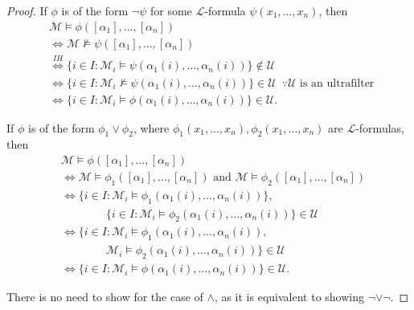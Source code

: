 \documentclass[notoc,notitlepage]{tufte-book}
\begin{document}
\begin{proof}
    \noindent
     If $\phi$ is of the form $\neg \psi$ for some $\mathcal{L}$-formula $\psi(x_1, \ldots, x_n)$, then
    \begin{align*}
      &\mathcal{M} \models \phi([\alpha_1], \ldots, [\alpha_n]) \\
      &\iff \mathcal{M} \not\models \psi([\alpha_1], \ldots, [\alpha_n]) \\
      &\overset{IH}{\iff} \{ i \in I : \mathcal{M}_i \models \psi(\alpha_1(i), \ldots, \alpha_n(i)) \} \notin \mathcal{U} \\
      &\iff \{ i \in I : \mathcal{M}_i \not\models \psi(\alpha_1(i), \ldots, \alpha_n(i)) \} \in \mathcal{U} \enspace \because \mathcal{U} \text{ is an ultrafilter } \\
      &\iff \{ i \in I : \mathcal{M}_i \models \phi(\alpha_1(i), \ldots, \alpha_n(i)) \} \in \mathcal{U}.
    \end{align*}

    If $\phi$ is of the form $\phi_1 \lor \phi_2$, where $\phi_1(x_1, \ldots, x_n), \phi_2(x_1, \ldots, x_n)$ are $\mathcal{L}$-formulas, then
    \begin{align*}
      &\mathcal{M} \models \phi([\alpha_1], \ldots, [\alpha_n]) \\
      &\iff \mathcal{M} \models \phi_1([\alpha_1], \ldots, [\alpha_n]) \text{ and } \mathcal{M} \models \phi_2([\alpha_1], \ldots, [\alpha_n]) \\
      &\iff \{ i \in I : \mathcal{M}_i \models \phi_1(\alpha_1(i), \ldots, \alpha_n(i)) \}, \\
      &\qquad\qquad \{ i \in I : \mathcal{M}_i \models \phi_2(\alpha_1(i), \ldots, \alpha_n(i)) \} \in \mathcal{U} \\
      &\iff \{ i \in I : \mathcal{M}_i \models \phi_1(\alpha_1(i), \ldots, \alpha_n(i)), \\
      &\qquad\qquad \mathcal{M}_i \models \phi_2(\alpha_1(i), \ldots, \alpha_n(i)) \} \in \mathcal{U} \\
      &\iff \{ i \in I : \mathcal{M}_i \models \phi(\alpha_1(i), \ldots, \alpha_n(i)) \} \in \mathcal{U}.
    \end{align*}

    There is no need to show for the case of $\land$, as it is equivalent to showing $\neg \lor \neg$.


\end{proof}
\end{document}
